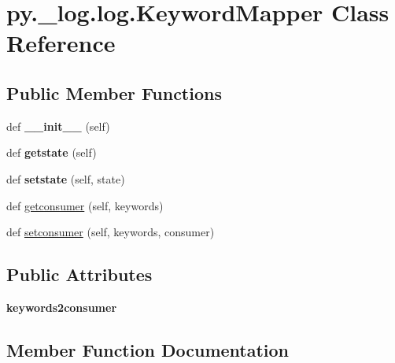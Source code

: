 \hypertarget{classpy_1_1__log_1_1log_1_1_keyword_mapper}{}\section{py.\+\_\+log.\+log.\+Keyword\+Mapper Class Reference}
\label{classpy_1_1__log_1_1log_1_1_keyword_mapper}
\subsection*{Public Member Functions}
\begin{DoxyCompactItemize}
\item 
\mbox{\label{classpy_1_1__log_1_1log_1_1_keyword_mapper_a3301687a6bf036c4baa2ed3f458af897}} 
def {\bfseries \+\_\+\+\_\+init\+\_\+\+\_\+} (self)
\item 
\mbox{\label{classpy_1_1__log_1_1log_1_1_keyword_mapper_aa8063c0d4a10f73fb3b9ae8c821a8e42}} 
def {\bfseries getstate} (self)
\item 
\mbox{\label{classpy_1_1__log_1_1log_1_1_keyword_mapper_a80f10cfd3315c258dee9827fd75b4668}} 
def {\bfseries setstate} (self, state)
\item 
def \hyperlink{classpy_1_1__log_1_1log_1_1_keyword_mapper_a51b85512739413d6104827b12f568c45}{getconsumer} (self, keywords)
\item 
def \hyperlink{classpy_1_1__log_1_1log_1_1_keyword_mapper_a048b870c1b47f5d5beede894bccb32e7}{setconsumer} (self, keywords, consumer)
\end{DoxyCompactItemize}
\subsection*{Public Attributes}
\begin{DoxyCompactItemize}
\item 
\mbox{\label{classpy_1_1__log_1_1log_1_1_keyword_mapper_a40e1d59a01dd782d222b5669372256a3}} 
{\bfseries keywords2consumer}
\end{DoxyCompactItemize}


\subsection{Member Function Documentation}
\mbox{\label{classpy_1_1__log_1_1log_1_1_keyword_mapper_a51b85512739413d6104827b12f568c45}} 
